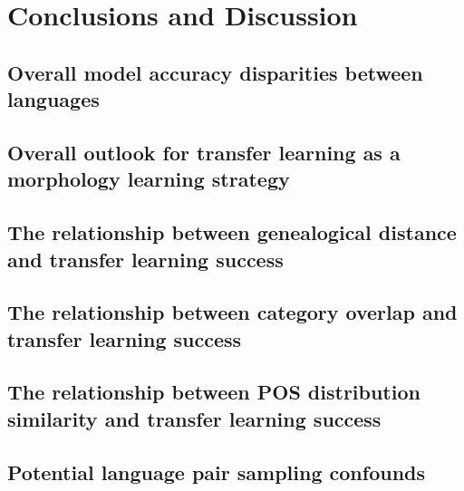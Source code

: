 \chapter{Conclusions and Discussion}

\section{Overall model accuracy disparities between languages}

\section{Overall outlook for transfer learning as a morphology learning strategy}

\section{The relationship between genealogical distance and transfer learning success}

\section{The relationship between category overlap and transfer learning success}

\section{The relationship between POS distribution similarity and transfer learning success}

\section{Potential language pair sampling confounds}
